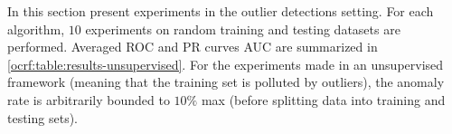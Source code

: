 In this section present experiments in the outlier detections setting. For each
algorithm, $10$ experiments on random training and testing datasets are
performed. Averaged \acs{ROC} and \acs{PR} curves \acs{AUC} are summarized in
\cref{ocrf:table:results-unsupervised}.
%
For the experiments made in an unsupervised framework (meaning that the
training set is polluted by outliers), the anomaly rate is arbitrarily bounded
to $10\%$ max (before splitting data into training and testing sets).

